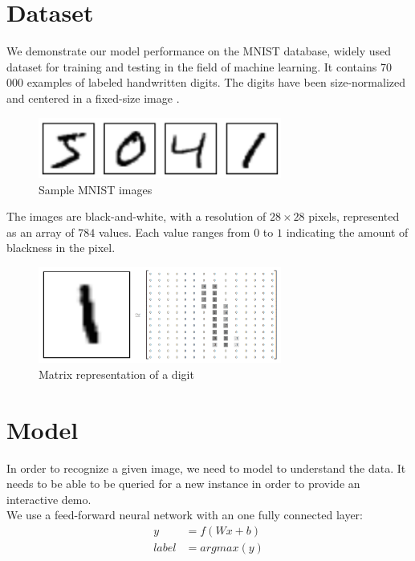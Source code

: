 \documentclass[a4paper]{article}
\begin{document}
\section{Dataset}
\label{sec:dataset}
We demonstrate our model performance on the MNIST database, widely used dataset for training and testing in the field of machine learning. It contains 70 000 examples of labeled handwritten digits. The digits have been size-normalized and centered in a fixed-size image \cite{mnist}. 

\begin{figure}[htb]
\centering
\includegraphics[width=8cm]{images/mnist-images.png}
\caption{Sample MNIST images \cite{tf}}
\end{figure}


The images are black-and-white, with a resolution of $28 \times 28$ pixels, represented as an array of $784$ values. Each value ranges from $0$ to $1$ indicating the amount of blackness in the pixel.

\begin{figure}[htb]
\centering
\includegraphics[width=8cm]{images/mnist-matrix.png}
\caption{Matrix representation of a digit \cite{tf}}
\end{figure}


\newpage
\section{Model}
\label{sec:model}
In order to recognize a given image, we need to model to understand the data. It needs to be able to be queried for a new instance in order to provide an interactive demo.
\\

We use a feed-forward neural network with an one fully connected layer:
\begin{align*}
y &= f(Wx + b) \\
label &= argmax(y)
\end{align*}
\end{document}
